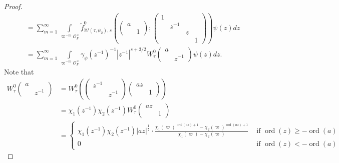 \documentclass[10pt,a4paper]{amsart}
\newcommand{\on}{\operatorname}
\newcommand{\ord}{\on{ord}}
\begin{document}
\begin{proof}
\begin{equation*}
\begin{split}
 & = \sum_{m=1}^\infty  \int\limits_{ \varpi^{-m}  \mathcal{O}_F^\times}    \tilde{f}_{\mathcal{W}(\tau,\psi_2), s} ^0  \left(\left(\begin{smallmatrix} a & \\&1 \end{smallmatrix}\right)  ; \left(\begin{smallmatrix} 1&&&\\&z^{-1}&&\\&&z&\\ &&&1\end{smallmatrix}\right)    \right)        \psi(z)dz \\
 &=   \sum_{m=1}^\infty  \int\limits_{ \varpi^{-m} \mathcal{O}_F^\times}   \gamma_\psi(z^{-1})^{-1} |z^{-1}|^{s+3/2} W_\tau^0  \left( \begin{smallmatrix} a & \\ & z^{-1} \end{smallmatrix}\right) \psi(z)dz.
\end{split}
\end{equation*}
Note that
\begin{equation*}
\begin{split}
W_\tau^0  \left( \begin{smallmatrix} a & \\ & z^{-1} \end{smallmatrix}\right) &=  W_\tau^0  \left(   \left( \begin{smallmatrix} z^{-1} & \\ & z^{-1} \end{smallmatrix}\right)  \left( \begin{smallmatrix} az & \\ & 1 \end{smallmatrix}\right)    \right) \\
&=\chi_1(z^{-1})\chi_2(z^{-1}) W_\tau^0  \left( \begin{smallmatrix} az & \\ & 1 \end{smallmatrix}\right)\\
  &=  \begin{cases}
\chi_1(z^{-1})\chi_2(z^{-1}) |az|^{\frac{1}{2}}  \cdot \frac{\chi_1(\varpi)^{\ord(az)+1}-\chi_2(\varpi)^{\ord(az)+1}}{\chi_1(\varpi)-\chi_2(\varpi)}       & \text{ if }\ord(z)\ge -\ord(a) \\
0 & \text{ if }\ord(z)<-\ord(a)
\end{cases}
\end{split}
\end{equation*}

\end{proof}
\end{document}

